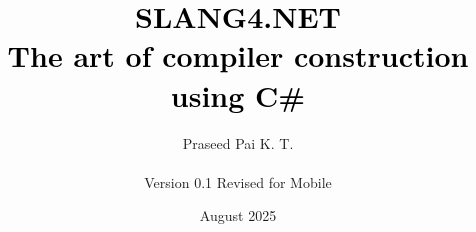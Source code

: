 \documentclass[openany,12pt]{book}
\begin{document}
\title{
    \textcolor{black}{SLANG4.NET} \\[6pt]
    \Large \textnormal{\textcolor{black}{The art of compiler construction using C\#}}
}
\author{Praseed Pai K. T. \\\\[6pt] Version 0.1 Revised for Mobile}
\date{August 2025}
\maketitle

\tableofcontents
\newpage

\mainmatter







\end{document}
